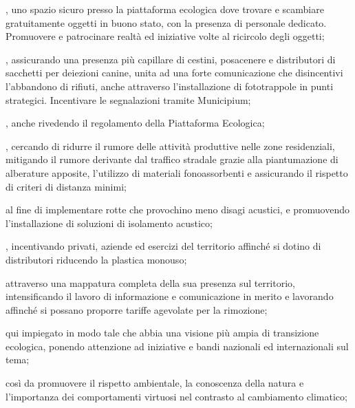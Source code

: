, uno spazio sicuro presso la piattaforma ecologica dove trovare e scambiare gratuitamente oggetti in buono stato, con la presenza di personale dedicato. Promuovere e patrocinare realtà ed iniziative volte al ricircolo degli oggetti;

, assicurando una presenza più capillare di cestini, posacenere e distributori di sacchetti per deiezioni canine, unita ad una forte comunicazione che disincentivi l'abbandono di rifiuti, anche attraverso l'installazione di fototrappole in punti strategici. Incentivare le segnalazioni tramite Municipium;

, anche rivedendo il regolamento della Piattaforma Ecologica; 

, cercando di ridurre il rumore delle attività produttive nelle zone residenziali, mitigando il rumore derivante dal traffico stradale grazie alla  piantumazione di alberature apposite, l'utilizzo di materiali fonoassorbenti e assicurando il rispetto di criteri di distanza minimi;

 al fine di implementare rotte che provochino meno disagi acustici, e promuovendo l'installazione di soluzioni di isolamento acustico;

, incentivando privati, aziende ed esercizi del territorio affinché si dotino di distributori riducendo la plastica monouso; 

 attraverso una mappatura completa della sua presenza sul territorio, intensificando il lavoro di informazione e comunicazione in merito e lavorando affinché si possano proporre tariffe agevolate per la rimozione; 

 qui impiegato in modo tale che abbia una visione più ampia di transizione ecologica, ponendo attenzione ad iniziative e bandi nazionali ed internazionali sul tema; 

 così da promuovere il rispetto ambientale, la conoscenza della natura e l'importanza dei comportamenti virtuosi nel contrasto al cambiamento climatico; 

